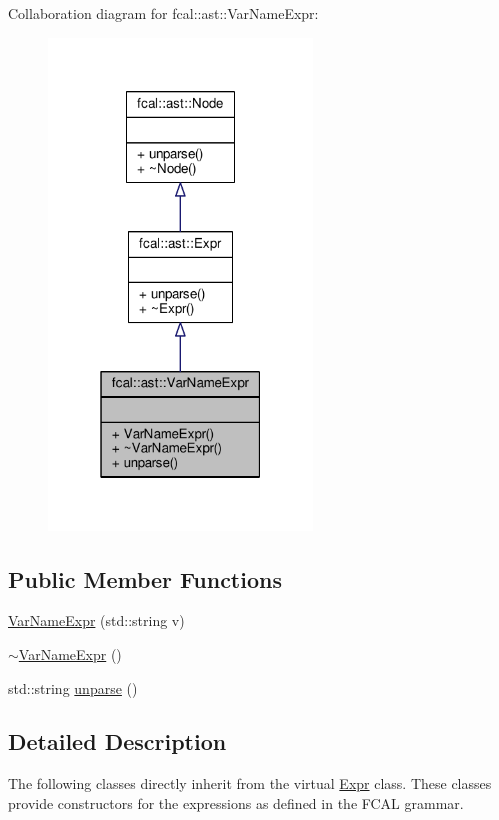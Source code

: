 Collaboration diagram for fcal\+:\+:ast\+:\+:Var\+Name\+Expr\+:
\nopagebreak
\begin{figure}[H]
\begin{center}
\leavevmode
\includegraphics[width=199pt]{classfcal_1_1ast_1_1VarNameExpr__coll__graph}
\end{center}
\end{figure}
\subsection*{Public Member Functions}
\begin{DoxyCompactItemize}
\item 
\hyperlink{classfcal_1_1ast_1_1VarNameExpr_a3aa9a01d6dd0b57ec3087856639d9b3e}{Var\+Name\+Expr} (std\+::string v)
\item 
\hyperlink{classfcal_1_1ast_1_1VarNameExpr_a80d4e6301e9e0cdb409f4579393d835f}{$\sim$\+Var\+Name\+Expr} ()
\item 
std\+::string \hyperlink{classfcal_1_1ast_1_1VarNameExpr_a07df9e3944650d2d2495d68af50dae0c}{unparse} ()
\end{DoxyCompactItemize}


\subsection{Detailed Description}
The following classes directly inherit from the virtual \hyperlink{classfcal_1_1ast_1_1Expr}{Expr} class. These classes provide constructors for the expressions as defined in the F\+C\+AL grammar. 

